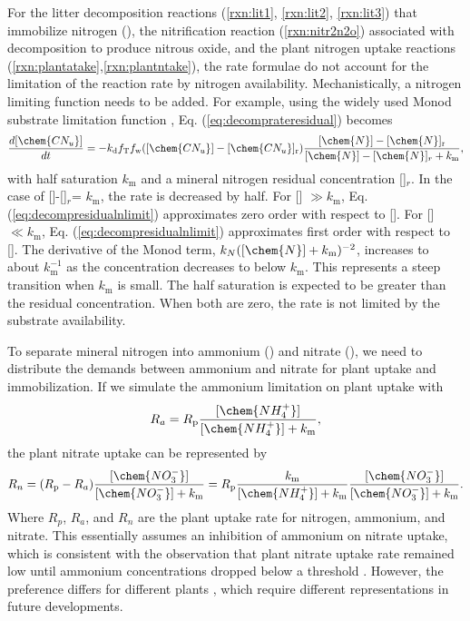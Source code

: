 \documentclass[gmd, manuscript]{copernicus}
\begin{document}
For the litter decomposition reactions (\ref{rxn:lit1}, \ref{rxn:lit2}, \ref{rxn:lit3}) that immobilize nitrogen (), the nitrification reaction (\ref{rxn:nitr2n2o}) associated with decomposition to produce nitrous oxide, and the plant nitrogen uptake reactions (\ref{rxn:plantatake},\ref{rxn:plantntake}), the rate formulae do not account for the limitation of the reaction rate by nitrogen
availability. Mechanistically, a nitrogen limiting function needs to be added. For example, using the widely used Monod substrate limitation function \citep{Hammond2003}, Eq.
(\ref{eq:decomprateresidual}) becomes 
\begin{equation}
\frac{d [\chem{CN_u}]}{d t} = -k_\text{d} f_\text{T} f_\text{w} ([\chem{CN_u}] -
[\chem{CN_u}]_\text{r}) \frac{[\chem{N}]-[\chem{N}]_\text{r}}{[\chem{N}]-[\chem{N}]_r +k_\text{m}},
\label{eq:decompresidualnlimit}
\end{equation}
with half saturation $k_\text{m}$ and a mineral nitrogen residual concentration []$_r$. In the case of []-[]$_r$= $k_\text{m}$, the rate is decreased by half.
For [] $\gg k_\text{m}$, Eq. (\ref{eq:decompresidualnlimit}) approximates zero order with respect to []. For []$\ll k_\text{m}$, Eq. (\ref{eq:decompresidualnlimit})
approximates first order with respect to []. The derivative of the Monod term, ${k_N}{([\chem{N}]+k_\text{m})^{-2}}$, increases to about $k_\text{m}^{-1}$ as the concentration
decreases to below $k_\text{m}$. This represents a steep transition when $k_\text{m}$ is small. The half saturation is expected to be greater than the residual concentration. When both are zero, the rate is not limited by the substrate availability. 

To separate mineral nitrogen into ammonium () and nitrate (), we need to distribute the demands between ammonium and nitrate for plant uptake and immobilization. If we simulate the ammonium limitation on plant uptake with 
\begin{equation}
R_a = R_\text{p} \frac{[\chem{NH_4^+}]}{[\chem{NH_4^+}]+k_\text{m}}, 
\label{eq:plantarate}
\end{equation}
the plant nitrate uptake can be represented by 
\begin{equation}
R_n = (R_\text{p} - R_a)\frac{[\chem{NO_3^-}]}{[\chem{NO_3^-}]+k_\text{m}} =
R_\text{p} \frac{k_\text{m}}{[\chem{NH_4^+}]+k_\text{m}}
\frac{[\chem{NO_3^-}]}{[\chem{NO_3^-}]+k_\text{m}}.  
\label{eq:plantnrate}
\end{equation}
Where $R_p$, $R_a$, and $R_n$ are the plant uptake rate for nitrogen, ammonium, and nitrate. This essentially assumes an inhibition of ammonium on nitrate uptake, which is consistent with
the observation that plant nitrate uptake rate remained low until ammonium concentrations dropped below a threshold \citep{eltrop1996}.  However, the preference differs for different plants \citep{Pfautsch2009,Warren2007,Nordin2001,Falkengren1995,Gherardi2013}, which require different representations in future developments.
\end{document}
